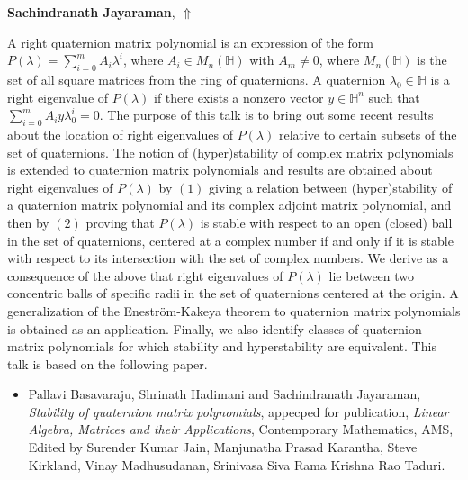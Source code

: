 \documentclass[ILAS2025-program.tex]{subfiles}
\begin{document}
\hypertarget{down0100}{}\begin{ilasabstract}
    
\textbf{Sachindranath Jayaraman},  \hfill \hyperlink{up0100}{$\Uparrow$}
    
    
\mtskip
    A right quaternion matrix polynomial is an expression of the form 
$P(\lambda) = \displaystyle \sum_{i=0}^{m}A_i \lambda^i$, where 
$A_i \in M_n(\mathbb{H})$ with $A_m \neq 0$, where 
$M_n(\mathbb{H})$ is the set of all square matrices from the ring of quaternions. 
A quaternion $\lambda_0 \in \mathbb{H}$ is a right eigenvalue of $P(\lambda)$ 
if there exists a nonzero vector $y \in \mathbb{H}^n$ such that 
$\displaystyle \sum_{i=0}^{m}A_i  y\lambda_0^i  =0$. The purpose of this talk is to 
bring out some recent results about the location of right eigenvalues of $P(\lambda)$ 
relative to certain subsets of the set of quaternions. The notion of (hyper)stability of 
complex matrix polynomials is extended to quaternion matrix polynomials and 
results are obtained about right eigenvalues of $P(\lambda)$ by  
$(1)$ giving a relation between (hyper)stability of a quaternion matrix polynomial and 
its complex adjoint matrix polynomial, and then by $(2)$ proving that $P(\lambda)$ is 
stable with respect to an open (closed) ball in the set of quaternions, centered at a complex 
number if and only if it is stable with respect to its intersection with the set of 
complex numbers.  We derive as a consequence of the above that right 
eigenvalues of $P(\lambda)$ lie between two concentric balls of specific radii in the 
set of quaternions centered at the origin. A generalization of the 
Enestr{\"o}m-Kakeya theorem to quaternion matrix polynomials is obtained as an 
application. Finally, we also identify classes of quaternion matrix polynomials for 
which stability and hyperstability are equivalent.  This talk is based on the following paper.

\begin{itemize}
\item Pallavi Basavaraju, Shrinath Hadimani and Sachindranath Jayaraman, 
\textit{Stability of quaternion matrix polynomials}, appecped for publication, 
\textit{Linear Algebra, Matrices and their Applications}, Contemporary Mathematics, 
AMS, Edited by Surender Kumar Jain, Manjunatha Prasad Karantha, Steve Kirkland, 
Vinay Madhusudanan, Srinivasa Siva Rama Krishna Rao Taduri.
\end{itemize}


\end{ilasabstract}
    
\end{document}
